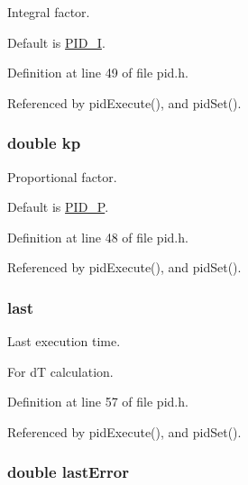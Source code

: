 Integral factor. 

Default is \hyperlink{group__config_ga2dfd5fcf8dd0bee1de9007fe8e161886}{P\-I\-D\-\_\-\-I}. 

Definition at line 49 of file pid.\-h.



Referenced by pid\-Execute(), and pid\-Set().

\hypertarget{struct_p_i_d_state_ac6390bc2d074992cc6ca37d132a5262d}{
\subsubsection[{kp}]{\setlength{\rightskip}{0pt plus 5cm}double kp}}\label{struct_p_i_d_state_ac6390bc2d074992cc6ca37d132a5262d}


Proportional factor. 

Default is \hyperlink{group__config_gab3ea7c9a4399d8844727806c960880ad}{P\-I\-D\-\_\-\-P}. 

Definition at line 48 of file pid.\-h.



Referenced by pid\-Execute(), and pid\-Set().

\hypertarget{struct_p_i_d_state_ad8672640f42e8308c593fafe968241f5}{
\subsubsection[{last}]{ last}}\label{struct_p_i_d_state_ad8672640f42e8308c593fafe968241f5}


Last execution time. 

For d\-T calculation. 

Definition at line 57 of file pid.\-h.



Referenced by pid\-Execute(), and pid\-Set().

\hypertarget{struct_p_i_d_state_a16066d446d47c9e2ca1dadb75b5f439c}{
\subsubsection[{last\-Error}]{\setlength{\rightskip}{0pt plus 5cm}double last\-Error}}\label{struct_p_i_d_state_a16066d446d47c9e2ca1dadb75b5f439c}


